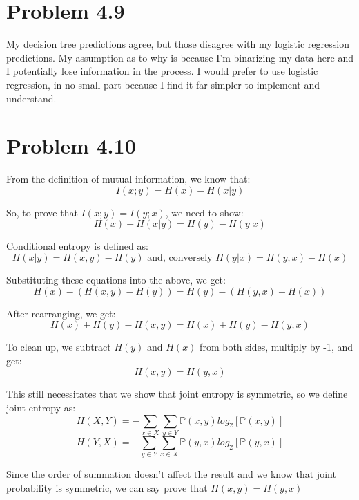 \documentclass{article}
\begin{document}
\section*{Problem 4.9}
My decision tree predictions agree, but those disagree with my logistic regression predictions. My assumption as to why is because I'm binarizing my data here and I potentially lose information in the process. I would prefer to use logistic regression, in no small part because I find it far simpler to implement and understand.

\section*{Problem 4.10}
From the definition of mutual information, we know that:
\[I(x;y) = H(x) - H(x|y)\]

So, to prove that $I(x;y) = I(y;x)$, we need to show:
\[H(x) - H(x|y) = H(y) - H(y|x)\]

Conditional entropy is defined as:
 \[H(x|y) = H(x,y) - H(y) \text{ and, conversely } H(y|x) = H(y,x) - H(x)\]


Substituting these equations into the above, we get:
\[H(x) - (H(x,y) - H(y)) = H(y) - (H(y, x) - H(x))\]

After rearranging, we get:
\[H(x) + H(y) - H(x,y) = H(x) + H(y) - H(y, x)\]

To clean up, we subtract $H(y)$ and $H(x)$ from both sides, multiply by -1, and get:
\[H(x,y) = H(y,x)\]

This still necessitates that we show that joint entropy is symmetric, so we define joint entropy as:
\[ H(X,Y) = -\sum_{x\in X} \sum_{y \in Y} \mathbb{P}(x,y)log_2[\mathbb{P}(x,y)]\]
\[ H(Y,X) = -\sum_{y \in Y} \sum_{x\in X} \mathbb{P}(y,x)log_2[\mathbb{P}(y,x)]\]

Since the order of summation doesn't affect the result and we know that joint probability is symmetric, we can say prove that $H(x,y) = H(y,x) $
\end{document}
